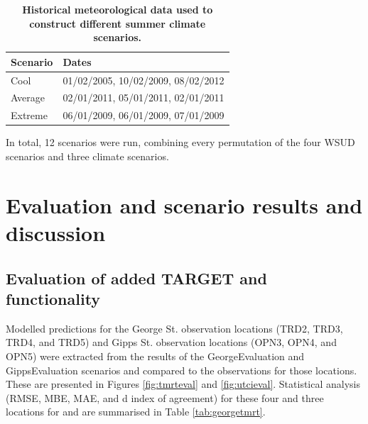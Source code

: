\documentclass[final,3p,times,authoryear]{elsarticle}
\begin{document}
\begin{table}[!htbp]
\caption{\bf Historical meteorological data used to construct different summer climate scenarios.  \label{tab:dates}}     
\begin{tabular}{ l l}
\textbf{Scenario} & \textbf{Dates}\\ \hline
Cool & 01/02/2005, 10/02/2009, 08/02/2012 \\ 
Average & 02/01/2011, 05/01/2011, 02/01/2011 \\ 
Extreme & 06/01/2009, 06/01/2009, 07/01/2009 \\ 
\hline
\end{tabular}
\end{table}

In total, 12 scenarios were run, combining every permutation of the four WSUD scenarios and three climate scenarios.


%

\section{Evaluation and scenario results and discussion}

\subsection{Evaluation of added TARGET  and  functionality}\label{sec:eval-htc}


Modelled predictions for the George St. observation locations (TRD2, TRD3, TRD4, and TRD5) and Gipps St. observation locations (OPN3, OPN4, and OPN5) were extracted from the results of the GeorgeEvaluation and GippsEvaluation scenarios and compared to the observations for those locations. These are presented in Figures \ref{fig:tmrteval} and \ref{fig:utcieval}. Statistical analysis (RMSE, MBE, MAE, and d index of agreement) for these four and three locations for  and  are summarised in Table \ref{tab:georgetmrt}.
\end{document}
